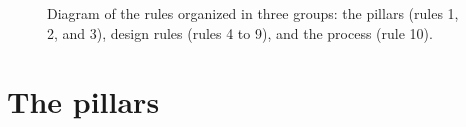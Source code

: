 \documentclass[10pt,letterpaper]{article}
\begin{document}
\begin{figure}[!h]
\centering

\caption{Diagram of the rules organized in three groups: the pillars (rules 1, 2, and 3), design rules (rules 4 to 9), and the process (rule 10).}
\label{fig:diagram}
\end{figure}


\section*{The pillars}
\end{document}
